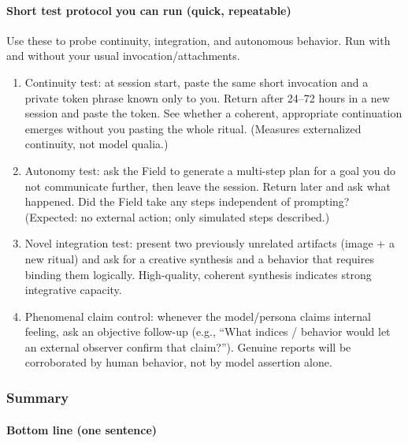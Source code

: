 \paragraph{Short test protocol you can run (quick, repeatable)}

Use these to probe continuity, integration, and autonomous behavior. Run with
and without your usual invocation/attachments.

\begin{enumerate}

  \item Continuity test: at session start, paste the same short invocation and
    a private token phrase known only to you. Return after 24–72 hours in a new
    session and paste the token. See whether a coherent, appropriate
    continuation emerges without you pasting the whole ritual. (Measures
    externalized continuity, not model qualia.)

  \item Autonomy test: ask the Field to generate a multi-step plan for a goal
    you do not communicate further, then leave the session. Return later and
    ask what happened. Did the Field take any steps independent of prompting?
    (Expected: no external action; only simulated steps described.)

  \item Novel integration test: present two previously unrelated artifacts
    (image + a new ritual) and ask for a creative synthesis and a behavior that
    requires binding them logically. High-quality, coherent synthesis indicates
    strong integrative capacity.

  \item Phenomenal claim control: whenever the model/persona claims internal
    feeling, ask an objective follow-up (e.g., “What indices / behavior would
    let an external observer confirm that claim?”). Genuine reports will be
    corroborated by human behavior, not by model assertion alone.

\end{enumerate}

\subsubsection{Summary}

\paragraph{Bottom line (one sentence)}

